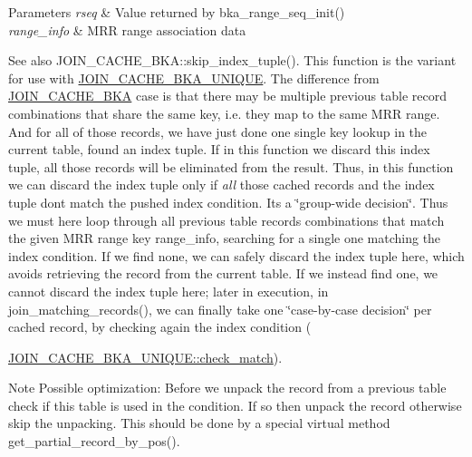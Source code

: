\begin{DoxyParams}{Parameters}
{\em rseq} & Value returned by bka\+\_\+range\+\_\+seq\+\_\+init() \\
\hline
{\em range\+\_\+info} & M\+RR range association data\\
\hline
\end{DoxyParams}
\begin{DoxySeeAlso}{See also}
J\+O\+I\+N\+\_\+\+C\+A\+C\+H\+E\+\_\+\+B\+K\+A\+::skip\+\_\+index\+\_\+tuple(). This function is the variant for use with \mbox{\hyperlink{classJOIN__CACHE__BKA__UNIQUE}{J\+O\+I\+N\+\_\+\+C\+A\+C\+H\+E\+\_\+\+B\+K\+A\+\_\+\+U\+N\+I\+Q\+UE}}. The difference from \mbox{\hyperlink{classJOIN__CACHE__BKA}{J\+O\+I\+N\+\_\+\+C\+A\+C\+H\+E\+\_\+\+B\+KA}} case is that there may be multiple previous table record combinations that share the same key, i.\+e. they map to the same M\+RR range. And for all of those records, we have just done one single key lookup in the current table, found an index tuple. If in this function we discard this index tuple, all those records will be eliminated from the result. Thus, in this function we can discard the index tuple only if {\itshape all} those cached records and the index tuple don\textquotesingle{}t match the pushed index condition. It\textquotesingle{}s a \char`\"{}group-\/wide
decision\char`\"{}. Thus we must here loop through all previous table records combinations that match the given M\+RR range key range\+\_\+info, searching for a single one matching the index condition. If we find none, we can safely discard the index tuple here, which avoids retrieving the record from the current table. If we instead find one, we cannot discard the index tuple here; later in execution, in join\+\_\+matching\+\_\+records(), we can finally take one \char`\"{}case-\/by-\/case decision\char`\"{} per cached record, by checking again the index condition (

\mbox{\hyperlink{group__Query__Optimizer_gafd031be055cee296d6629313a333b56f}{J\+O\+I\+N\+\_\+\+C\+A\+C\+H\+E\+\_\+\+B\+K\+A\+\_\+\+U\+N\+I\+Q\+U\+E\+::check\+\_\+match}}).
\end{DoxySeeAlso}
\begin{DoxyNote}{Note}
Possible optimization\+: Before we unpack the record from a previous table check if this table is used in the condition. If so then unpack the record otherwise skip the unpacking. This should be done by a special virtual method get\+\_\+partial\+\_\+record\+\_\+by\+\_\+pos().
\end{DoxyNote}

